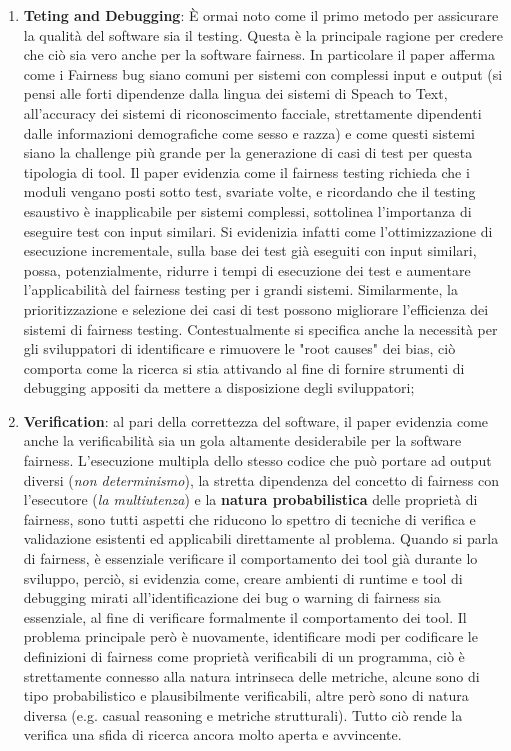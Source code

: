 \begin{enumerate}
    \item \textbf{Teting and Debugging}: È ormai noto come il primo metodo per assicurare la qualità del software sia il testing. Questa è la principale ragione per credere che ciò sia vero anche per la software fairness. In particolare il paper afferma come i Fairness bug siano comuni per sistemi con complessi input e output (si pensi alle forti dipendenze dalla lingua dei sistemi di Speach to Text, all'accuracy dei sistemi di riconoscimento facciale, strettamente dipendenti dalle informazioni demografiche come sesso e razza) e come questi sistemi siano la challenge più grande per la generazione di casi di test per questa tipologia di tool. Il paper evidenzia come il fairness testing richieda che i moduli vengano posti sotto test, svariate volte, e ricordando che il testing esaustivo è inapplicabile per sistemi complessi, sottolinea l'importanza di eseguire test con input similari. Si evidenizia infatti come l'ottimizzazione di esecuzione incrementale, sulla base dei test già eseguiti con input similari, possa, potenzialmente, ridurre i tempi di esecuzione dei test e aumentare l'applicabilità del fairness testing per i grandi sistemi. Similarmente, la prioritizzazione e selezione dei casi di test possono migliorare l'efficienza dei sistemi di fairness testing. Contestualmente si specifica anche la necessità per gli sviluppatori di identificare e rimuovere le "root causes" dei bias, ciò comporta come la ricerca si stia attivando al fine di fornire strumenti di debugging appositi da mettere a disposizione degli sviluppatori;
    \item\textbf{Verification}: al pari della correttezza del software, il paper evidenzia come anche la verificabilità sia un gola altamente desiderabile per la software fairness. L'esecuzione multipla dello stesso codice che può portare ad output diversi (\textit{non determinismo}), la stretta dipendenza del concetto di fairness con l'esecutore (\textit{la multiutenza}) e la \textbf{natura probabilistica} delle proprietà di fairness, sono tutti aspetti che riducono lo spettro di tecniche di verifica e validazione esistenti ed applicabili direttamente al problema. Quando si parla di fairness, è essenziale verificare il comportamento dei tool già durante lo sviluppo, perciò, si evidenzia come, creare ambienti di runtime e tool di debugging mirati all'identificazione dei bug o warning di fairness sia essenziale, al fine di verificare formalmente il comportamento dei tool. Il problema principale però è nuovamente, identificare modi per codificare le definizioni di fairness come proprietà verificabili di un programma, ciò è strettamente connesso alla natura intrinseca delle metriche, alcune sono di tipo probabilistico e plausibilmente verificabili, altre però sono di natura diversa (e.g. casual reasoning e metriche strutturali). Tutto ciò rende la verifica una sfida di ricerca ancora molto aperta e avvincente.
\end{enumerate}

